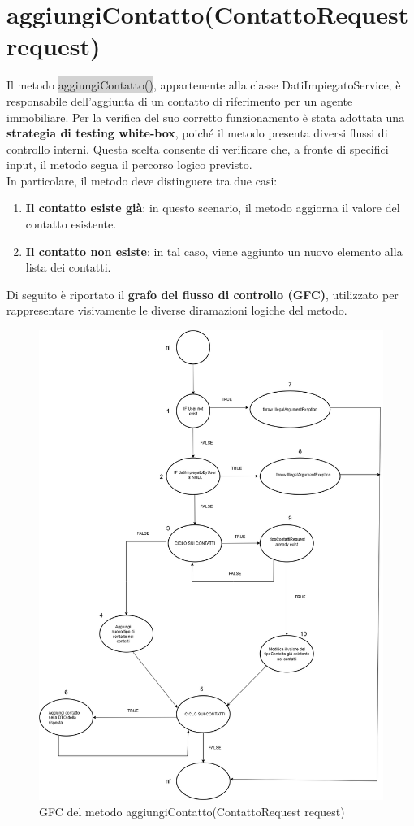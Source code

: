 \section{aggiungiContatto(ContattoRequest request)}

Il metodo  \colorbox{lightgray}{aggiungiContatto()}, appartenente alla classe DatiImpiegatoService, è responsabile dell’aggiunta di un contatto di riferimento per un agente immobiliare.
Per la verifica del suo corretto funzionamento è stata adottata una \textbf{strategia di testing white-box}, poiché il metodo presenta diversi flussi di controllo interni. Questa scelta consente di verificare che, a fronte di specifici input, il metodo segua il percorso logico previsto.
\\
In particolare, il metodo deve distinguere tra due casi:
\begin{enumerate}
	\item \textbf{Il contatto esiste già}: in questo scenario, il metodo aggiorna il valore del contatto esistente.
	\item \textbf{Il contatto non esiste}: in tal caso, viene aggiunto un nuovo elemento alla lista dei contatti.
\end{enumerate}
Di seguito è riportato il \textbf{grafo del flusso di controllo (GFC)}, utilizzato per rappresentare visivamente le diverse diramazioni logiche del metodo.

\begin{figure}[H]
	\centering
	\includegraphics[width=0.7\linewidth]{Immagini/unit test/GrafoAggiungiUnContatto.png}
	\caption[GFC aggiungiContatto]{GFC del metodo aggiungiContatto(ContattoRequest request)}
\end{figure}

